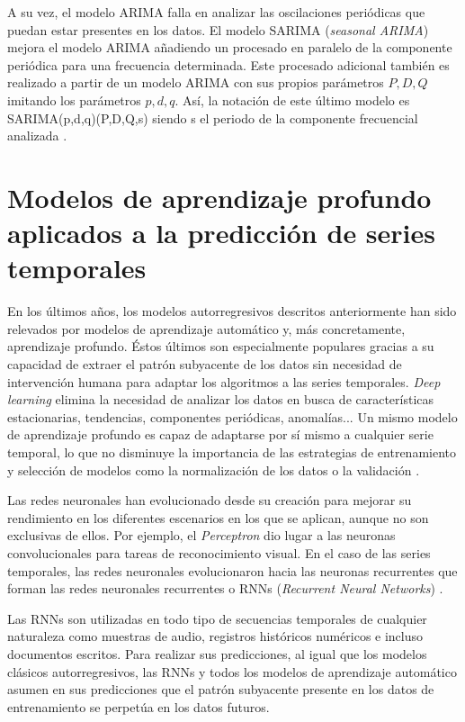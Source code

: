 A su vez, el modelo ARIMA falla en analizar las oscilaciones periódicas que puedan estar presentes en los datos. El modelo SARIMA (\textit{seasonal ARIMA}) mejora el modelo ARIMA añadiendo un procesado en paralelo de la componente periódica para una frecuencia determinada. Este procesado adicional también es realizado a partir de un modelo ARIMA con sus propios parámetros $P, D, Q$ imitando los parámetros $p,d,q$. Así, la notación de este último modelo es SARIMA(p,d,q)(P,D,Q,s) siendo s el periodo de la componente frecuencial analizada \cite{sarima1,machinelearningbook}.

\section{Modelos de aprendizaje profundo aplicados a la predicción de series temporales}
En los últimos años, los modelos autorregresivos descritos anteriormente han sido relevados por modelos de aprendizaje automático y, más concretamente, aprendizaje profundo. Éstos últimos son especialmente populares gracias a su capacidad de extraer el patrón subyacente de los datos sin necesidad de intervención humana para adaptar los algoritmos a las series temporales. \textit{Deep learning} elimina la necesidad de analizar los datos en busca de características estacionarias, tendencias, componentes periódicas, anomalías... Un mismo modelo de aprendizaje profundo es capaz de adaptarse por sí mismo a cualquier serie temporal, lo que no disminuye la importancia de las estrategias de entrenamiento y selección de modelos como la normalización de los datos o la validación \cite{deeplearning}.

Las redes neuronales han evolucionado desde su creación para mejorar su rendimiento en los diferentes escenarios en los que se aplican, aunque no son exclusivas de ellos. Por ejemplo, el \textit{Perceptron} \cite{rosenblatt1957} dio lugar a las neuronas convolucionales para tareas de reconocimiento visual. En el caso de las series temporales, las redes neuronales evolucionaron hacia las neuronas recurrentes que forman las redes neuronales recurrentes o RNNs (\textit{Recurrent Neural Networks}) \cite{machinelearningbook, rnn2}.

Las RNNs son utilizadas en todo tipo de secuencias temporales de cualquier naturaleza como muestras de audio, registros históricos numéricos e incluso documentos escritos. Para realizar sus predicciones, al igual que los modelos clásicos autorregresivos, las RNNs y todos los modelos de aprendizaje automático asumen en sus predicciones que el patrón subyacente presente en los datos de entrenamiento se perpetúa en los datos futuros.


